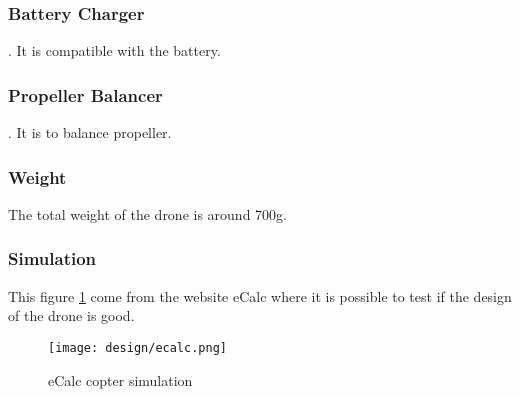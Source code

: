 \subsubsection{Battery Charger}
\cite{bangood_battery_charger}. It is compatible with the battery.

\subsubsection{Propeller Balancer}
\cite{bangood_prop_balancer}. It is to balance propeller.

\subsubsection{Weight}
The total weight of the drone is around 700g.

\subsubsection{Simulation}
This figure \ref{fig:ecalc} come from the website eCalc where it is possible to test if the design of the drone is good.
\begin{figure}[!ht]
    \centering
    \texttt{[image: design/ecalc.png]}
    \caption{eCalc copter simulation}
    \label{fig:ecalc}
\end{figure}
